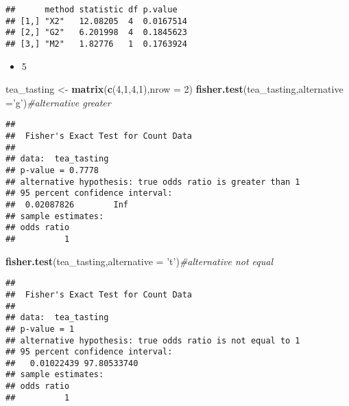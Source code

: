 \documentclass[12pt,hyperref,]{ctexart}
\newenvironment{Shaded}{\begin{snugshade}}{\end{snugshade}}
\newcommand{\CommentTok}[1]{\textcolor[rgb]{0.56,0.35,0.01}{\textit{#1}}}
\newcommand{\DataTypeTok}[1]{\textcolor[rgb]{0.13,0.29,0.53}{#1}}
\newcommand{\DecValTok}[1]{\textcolor[rgb]{0.00,0.00,0.81}{#1}}
\newcommand{\KeywordTok}[1]{\textcolor[rgb]{0.13,0.29,0.53}{\textbf{#1}}}
\newcommand{\NormalTok}[1]{#1}
\newcommand{\StringTok}[1]{\textcolor[rgb]{0.31,0.60,0.02}{#1}}
\providecommand{\tightlist}{%
  \setlength{\itemsep}{0pt}\setlength{\parskip}{0pt}}
\begin{document}
\begin{verbatim}
##      method statistic df p.value  
## [1,] "X2"   12.08205  4  0.0167514
## [2,] "G2"   6.201998  4  0.1845623
## [3,] "M2"   1.82776   1  0.1763924
\end{verbatim}

\begin{itemize}
\tightlist
\item
  5
\end{itemize}

\begin{Shaded}
\begin{Highlighting}[]
\NormalTok{tea_tasting <-}\StringTok{ }\KeywordTok{matrix}\NormalTok{(}\KeywordTok{c}\NormalTok{(}\DecValTok{4}\NormalTok{,}\DecValTok{1}\NormalTok{,}\DecValTok{4}\NormalTok{,}\DecValTok{1}\NormalTok{),}\DataTypeTok{nrow =} \DecValTok{2}\NormalTok{)}
\KeywordTok{fisher.test}\NormalTok{(tea_tasting,}\DataTypeTok{alternative =}\StringTok{'g'}\NormalTok{)}\CommentTok{#alternative greater}
\end{Highlighting}
\end{Shaded}

\begin{verbatim}
## 
##  Fisher's Exact Test for Count Data
## 
## data:  tea_tasting
## p-value = 0.7778
## alternative hypothesis: true odds ratio is greater than 1
## 95 percent confidence interval:
##  0.02087826        Inf
## sample estimates:
## odds ratio 
##          1
\end{verbatim}

\begin{Shaded}
\begin{Highlighting}[]
\KeywordTok{fisher.test}\NormalTok{(tea_tasting,}\DataTypeTok{alternative =} \StringTok{'t'}\NormalTok{)}\CommentTok{#alternative not equal}
\end{Highlighting}
\end{Shaded}

\begin{verbatim}
## 
##  Fisher's Exact Test for Count Data
## 
## data:  tea_tasting
## p-value = 1
## alternative hypothesis: true odds ratio is not equal to 1
## 95 percent confidence interval:
##   0.01022439 97.80533740
## sample estimates:
## odds ratio 
##          1
\end{verbatim}
\end{document}
